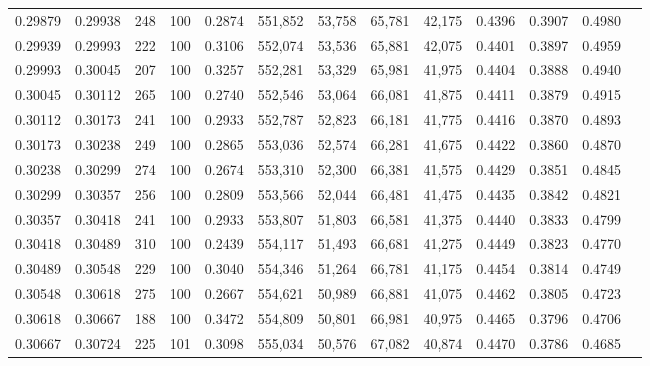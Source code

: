 \begin{tabular}{rrrrrrrrrrrrr}
0.29879 & 0.29938 &   248 & 100 &                                     0.2874 & 551,852 &  53,758 &  65,781 &  42,175 & 0.4396 & 0.3907 & 0.4980 \\
0.29939 & 0.29993 &   222 & 100 &                                     0.3106 & 552,074 &  53,536 &  65,881 &  42,075 & 0.4401 & 0.3897 & 0.4959 \\
0.29993 & 0.30045 &   207 & 100 &                                     0.3257 & 552,281 &  53,329 &  65,981 &  41,975 & 0.4404 & 0.3888 & 0.4940 \\
0.30045 & 0.30112 &   265 & 100 &                                     0.2740 & 552,546 &  53,064 &  66,081 &  41,875 & 0.4411 & 0.3879 & 0.4915 \\
0.30112 & 0.30173 &   241 & 100 &                                     0.2933 & 552,787 &  52,823 &  66,181 &  41,775 & 0.4416 & 0.3870 & 0.4893 \\
0.30173 & 0.30238 &   249 & 100 &                                     0.2865 & 553,036 &  52,574 &  66,281 &  41,675 & 0.4422 & 0.3860 & 0.4870 \\
0.30238 & 0.30299 &   274 & 100 &                                     0.2674 & 553,310 &  52,300 &  66,381 &  41,575 & 0.4429 & 0.3851 & 0.4845 \\
0.30299 & 0.30357 &   256 & 100 &                                     0.2809 & 553,566 &  52,044 &  66,481 &  41,475 & 0.4435 & 0.3842 & 0.4821 \\
0.30357 & 0.30418 &   241 & 100 &                                     0.2933 & 553,807 &  51,803 &  66,581 &  41,375 & 0.4440 & 0.3833 & 0.4799 \\
0.30418 & 0.30489 &   310 & 100 &                                     0.2439 & 554,117 &  51,493 &  66,681 &  41,275 & 0.4449 & 0.3823 & 0.4770 \\
0.30489 & 0.30548 &   229 & 100 &                                     0.3040 & 554,346 &  51,264 &  66,781 &  41,175 & 0.4454 & 0.3814 & 0.4749 \\
0.30548 & 0.30618 &   275 & 100 &                                     0.2667 & 554,621 &  50,989 &  66,881 &  41,075 & 0.4462 & 0.3805 & 0.4723 \\
0.30618 & 0.30667 &   188 & 100 &                                     0.3472 & 554,809 &  50,801 &  66,981 &  40,975 & 0.4465 & 0.3796 & 0.4706 \\
0.30667 & 0.30724 &   225 & 101 &                                     0.3098 & 555,034 &  50,576 &  67,082 &  40,874 & 0.4470 & 0.3786 & 0.4685 \\

\end{tabular}
